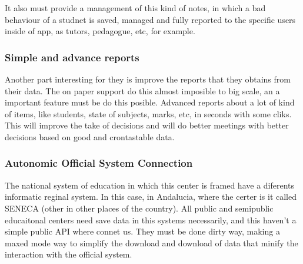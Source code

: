 It also must provide a management of this kind of notes, in which a bad behaviour of a studnet is saved, managed and fully reported to the specific users inside of app, as tutors, pedagogue, etc, for example.

\bigskip
\subsubsection{Simple and advance reports}
\bigskip

Another part interesting for they is improve the reports that they obtains from their data. The on paper support do this almost imposible to big scale, an a important feature must be do this posible. Advanced reports about a lot of kind of items, like students, state of subjects, marks, etc, in seconds with some cliks.
This will improve the take of decisions and will do better meetings with better decisions based on good and crontastable data.

\bigskip
\subsubsection{Autonomic Official System Connection}
\bigskip

The national system of education in which this center is framed have a diferents informatic reginal system. In this case, in Andalucia, where the certer is it called SENECA (other in other places of the country). All public and semipublic educaitonal centers need save data in this systems necessarily, and this haven't a simple public API where connet us. They must be done dirty way, making a maxed mode way to simplify the download and download of data that minify the interaction with the official system.

